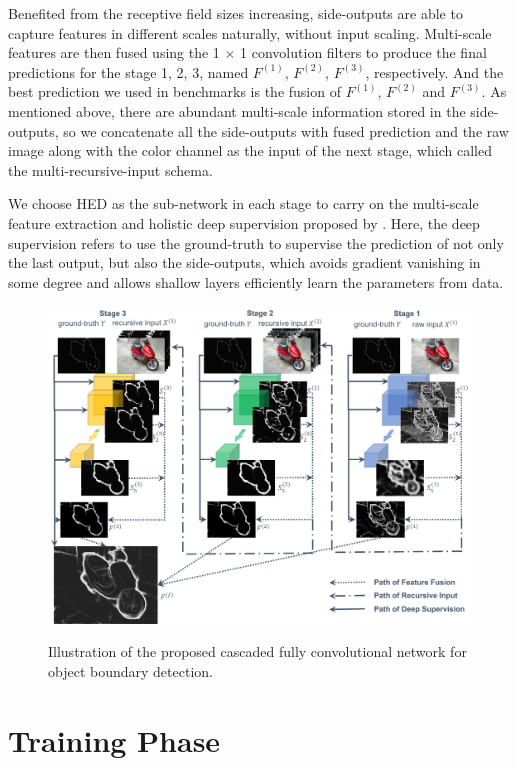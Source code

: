 \documentclass[senior]{IPSstyle}
\begin{document}
Benefited from the receptive field sizes increasing, side-outputs are able to capture features in different scales naturally, without input scaling. Multi-scale features are then fused using the 1 \(\times\) 1 convolution filters to produce the final predictions for the stage 1, 2, 3, named \(F^{(1)}\), \(F^{(2)}\), \(F^{(3)}\), respectively. And the best prediction we used in benchmarks is the fusion of \(F^{(1)}\), \(F^{(2)}\) and \(F^{(3)}\). As mentioned above, there are abundant multi-scale information stored in the side-outputs, so we concatenate all the side-outputs with fused prediction and the raw image along with the color channel as the input of the next stage, which called the multi-recursive-input schema. 

We choose HED\cite{Xie2015} as the sub-network in each stage to carry on the multi-scale feature extraction and holistic deep supervision proposed by \cite{Xie2015}. Here, the deep supervision refers to use the ground-truth to supervise the prediction of not only the last output, but also the side-outputs\cite{Xie2015}, which avoids gradient vanishing in some degree and allows shallow layers efficiently learn the parameters from data. 

\begin{figure}[t]
  \centering
  \includegraphics[width=15cm]{network.png}\\
  \caption{Illustration of the proposed cascaded fully convolutional network for object boundary detection.}\label{network}
\end{figure}


\section{Training Phase} \label{training phase}
\end{document}
